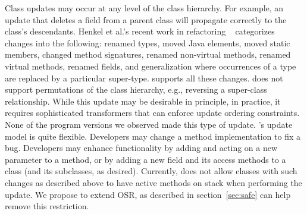 Class updates may occur at any level of the class hierarchy.  For
example, an update that deletes a field from a parent class will
propagate correctly to the class's descendants. Henkel et al.'s recent work in
refactoring ~\cite{Fowler,HD:05} categorizes changes into the following: renamed
types, moved Java elements, moved static members, changed method
signatures, renamed non-virtual methods, renamed virtual methods, renamed
fields, and generalization where occurrences of a type are replaced by a
particular super-type. \DSU{} supports all these changes.
\DSU{} does not support permutations of the class hierarchy, e.g.,
reversing a super-class relationship.  While this update may be desirable
in principle, in practice, it requires sophisticated transformers that can
enforce update ordering constraints. None of the program versions we
observed made this type of update.
\DSU's update model is quite flexible.  Developers may change a method
implementation to fix a bug.  Developers may enhance functionality by
adding and acting on a new parameter to a method, or by adding a new
field and its access methods to a class (and its subclasses, as desired).
Currently, \DSU{} does not
allow classes with such changes as described above to have active methods
on stack when performing the update. We propose to extend \acf{OSR},
as described in section~\ref{sec:safe} can help remove this restriction.

